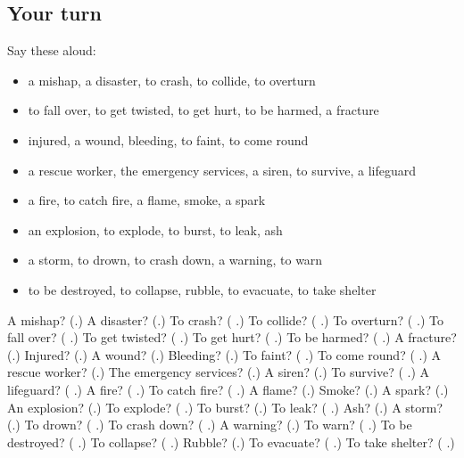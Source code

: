 \subsection*{Your turn}
Say these aloud:

\begin{itemize}
\raggedright
  \item a mishap, a disaster, to crash, to collide, to overturn
  \item to fall over, to get twisted, to get hurt, to be harmed, a fracture
  \item injured, a wound, bleeding, to faint, to come round
  \item a rescue worker, the emergency services, a siren, to survive, a lifeguard
  \item a fire, to catch fire, a flame, smoke, a spark
  \item an explosion, to explode, to burst, to leak, ash
  \item a storm, to drown, to crash down, a warning, to warn
  \item to be destroyed, to collapse, rubble, to evacuate, to take shelter
\end{itemize}

\begin{tcolorbox}[breakable,colback=teal!4,colframe=teal!35!black,title={Before you move on}]
A mishap? (\textbf{}.) A disaster? (\textbf{}.) To crash? (\textbf{ }.) To collide? (\textbf{ }.) To overturn? (\textbf{ }.) To fall over? (\textbf{ }.) To get twisted? (\textbf{ }.) To get hurt? (\textbf{ }.) To be harmed? (\textbf{ }.) A fracture? (\textbf{}.) Injured? (\textbf{}.) A wound? (\textbf{}.) Bleeding? (\textbf{}.) To faint? (\textbf{ }.) To come round? (\textbf{  }.) A rescue worker? (\textbf{}.) The emergency services? (\textbf{}.) A siren? (\textbf{}.) To survive? (\textbf{ }.) A lifeguard? (\textbf{ }.) A fire? (\textbf{ }.) To catch fire? (\textbf{ }.) A flame? (\textbf{}.) Smoke? (\textbf{}.) A spark? (\textbf{}.) An explosion? (\textbf{}.) To explode? (\textbf{ }.) To burst? (\textbf{}.) To leak? (\textbf{ }.) Ash? (\textbf{}.) A storm? (\textbf{}.) To drown? (\textbf{ }.) To crash down? (\textbf{ }.) A warning? (\textbf{}.) To warn? (\textbf{ }.) To be destroyed? (\textbf{ }.) To collapse? (\textbf{ }.) Rubble? (\textbf{}.) To evacuate? (\textbf{ }.) To take shelter? (\textbf{ }.)
\end{tcolorbox}
